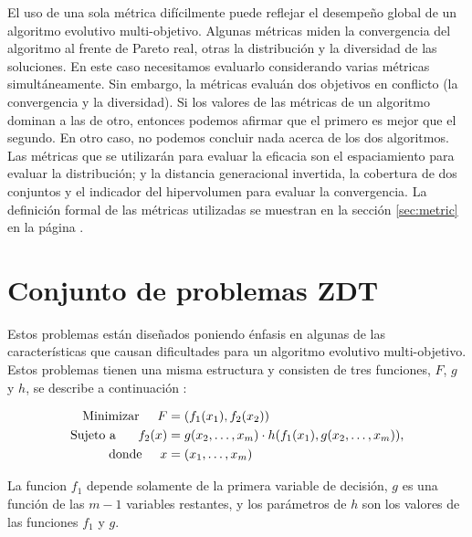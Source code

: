 El uso de una sola m\'etrica dif\'icilmente puede reflejar el desempe\~no global de un algoritmo evolutivo multi-objetivo. Algunas
m\'etricas miden la convergencia del algoritmo al frente de Pareto real, otras la distribuci\'on y la diversidad de las soluciones. 
En este caso necesitamos evaluarlo considerando varias m\'etricas simult\'aneamente. Sin embargo, la m\'etricas evalu\'an dos 
objetivos en conflicto (la convergencia y la diversidad). Si los valores de las m\'etricas de un algoritmo dominan a las de otro,
entonces podemos afirmar que el primero es mejor que el segundo. En otro caso, no podemos concluir nada acerca de los dos algoritmos.
Las m\'etricas que se utilizar\'an para evaluar la eficacia son el espaciamiento para evaluar la distribuci\'on; y la distancia generacional 
invertida, la cobertura de dos conjuntos y el indicador del hipervolumen para evaluar la convergencia. La definici\'on formal de las m\'etricas 
utilizadas se muestran en la secci\'on \ref{sec:metric} en la p\'agina \pageref{sec:metric}.

\newpage
\section{Conjunto de problemas ZDT}

Estos problemas est\'an dise\~nados poniendo \'enfasis en algunas de las caracter\'isticas que causan dificultades para un algoritmo 
evolutivo multi-objetivo. Estos problemas tienen una misma estructura y consisten de tres funciones, $F$, $g$ y $h$, se describe a 
continuaci\'on \cite{Zitzler2000}:

\begin{align*}
\text{Minimizar}\hspace{0.5cm} F&=(f_1(x_1),f_2(x_2))\\
\text{Sujeto a }\hspace{0.5cm} f_2(x)&=g(x_2,\ldots,x_m)\cdot h(f_1(x_1),g(x_2,\ldots,x_m)),\\
\text{donde}\hspace{0.5cm} x&= (x_1,\ldots, x_m)
\end{align*}

La funcion $f_1$ depende solamente de la primera variable de decisi\'on, $g$ es una funci\'on de las
$m-1$ variables restantes, y los par\'ametros de $h$ son los valores de las funciones $f_1$ y $g$.

